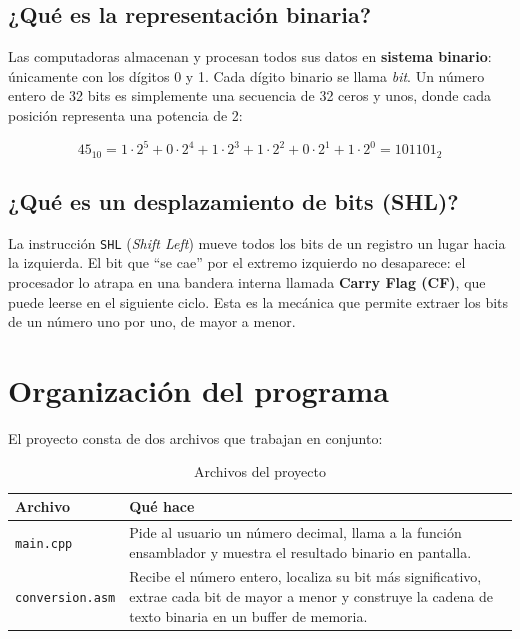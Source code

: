 \documentclass[12pt, letterpaper]{article}
\begin{document}
\subsection*{¿Qué es la representación binaria?}

Las computadoras almacenan y procesan todos sus datos en \textbf{sistema binario}: únicamente con los dígitos 0 y 1. Cada dígito binario se llama \textit{bit}. Un número entero de 32 bits es simplemente una secuencia de 32 ceros y unos, donde cada posición representa una potencia de 2:

\begin{equation}
    45_{10} = 1 \cdot 2^5 + 0 \cdot 2^4 + 1 \cdot 2^3 + 1 \cdot 2^2 + 0 \cdot 2^1 + 1 \cdot 2^0 = 101101_2
\end{equation}

\subsection*{¿Qué es un desplazamiento de bits (SHL)?}

La instrucción \texttt{SHL} (\textit{Shift Left}) mueve todos los bits de un registro un lugar hacia la izquierda. El bit que ``se cae'' por el extremo izquierdo no desaparece: el procesador lo atrapa en una bandera interna llamada \textbf{Carry Flag (CF)}, que puede leerse en el siguiente ciclo. Esta es la mecánica que permite extraer los bits de un número uno por uno, de mayor a menor.

\section{Organización del programa}

El proyecto consta de dos archivos que trabajan en conjunto:

\begin{table}[H]
    \centering
    \begin{tabular}{@{}lp{9cm}@{}}
        \toprule
        \textbf{Archivo} & \textbf{Qué hace} \\
        \midrule
        \texttt{main.cpp}       & Pide al usuario un número decimal, llama a la función ensamblador y muestra el resultado binario en pantalla. \\
        \texttt{conversion.asm} & Recibe el número entero, localiza su bit más significativo, extrae cada bit de mayor a menor y construye la cadena de texto binaria en un buffer de memoria. \\
        \bottomrule
    \end{tabular}
    \caption{Archivos del proyecto}
\end{table}
\end{document}
